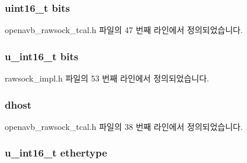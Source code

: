 \subsubsection[{\texorpdfstring{bits}{bits}}]{\setlength{\rightskip}{0pt plus 5cm}uint16\+\_\+t bits}\hypertarget{struct____attribute_____a0c1105f0af8d3db3f02c6174eb15a79a}{}\label{struct____attribute_____a0c1105f0af8d3db3f02c6174eb15a79a}


openavb\+\_\+rawsock\+\_\+tcal.\+h 파일의 47 번째 라인에서 정의되었습니다.

\subsubsection[{\texorpdfstring{bits}{bits}}]{\setlength{\rightskip}{0pt plus 5cm}u\+\_\+int16\+\_\+t bits}\hypertarget{struct____attribute_____a5bf9a142f4282e4c697c49ef9cf2b37a}{}\label{struct____attribute_____a5bf9a142f4282e4c697c49ef9cf2b37a}


rawsock\+\_\+impl.\+h 파일의 53 번째 라인에서 정의되었습니다.

\subsubsection[{\texorpdfstring{dhost}{dhost}}]{ dhost}\hypertarget{struct____attribute_____a47cfe4a6145184651112ff8fe6dc80f8}{}\label{struct____attribute_____a47cfe4a6145184651112ff8fe6dc80f8}


openavb\+\_\+rawsock\+\_\+tcal.\+h 파일의 38 번째 라인에서 정의되었습니다.

\subsubsection[{\texorpdfstring{ethertype}{ethertype}}]{\setlength{\rightskip}{0pt plus 5cm}u\+\_\+int16\+\_\+t ethertype}\hypertarget{struct____attribute_____aa3277a0009d97b5ec894357c7ce532cd}{}\label{struct____attribute_____aa3277a0009d97b5ec894357c7ce532cd}


